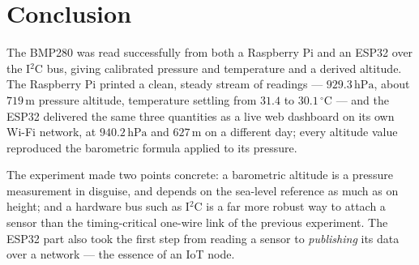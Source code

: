 \documentclass[10pt,a4paper]{article}
\begin{document}
\section{Conclusion}

The BMP280 was read successfully from both a Raspberry Pi and an ESP32 over the
I$^2$C bus, giving calibrated pressure and temperature and a derived altitude. The
Raspberry Pi printed a clean, steady stream of readings --- $929.3\,\mathrm{hPa}$, about
$719\,\mathrm{m}$ pressure altitude, temperature settling from $31.4$ to
$30.1\,^{\circ}\mathrm{C}$ --- and the ESP32 delivered the same three quantities as a
live web dashboard on its own Wi-Fi network, at $940.2\,\mathrm{hPa}$ and
$627\,\mathrm{m}$ on a different day; every altitude value reproduced the barometric
formula applied to its pressure.

The experiment made two points concrete: a barometric altitude is a pressure
measurement in disguise, and depends on the sea-level reference as much as on height;
and a hardware bus such as I$^2$C is a far more robust way to attach a sensor than the
timing-critical one-wire link of the previous experiment. The ESP32 part also took the
first step from reading a sensor to \emph{publishing} its data over a network --- the
essence of an IoT node.
\end{document}
